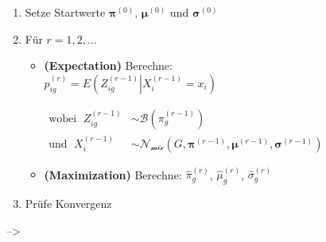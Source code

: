 \documentclass[
]{book}
\begin{document}
\begin{enumerate}
\def\labelenumi{\arabic{enumi}.}
\item
  Setze Startwerte \(\boldsymbol{\pi}^{(0)}\), \(\boldsymbol{\mu}^{(0)}\) und \(\boldsymbol{\sigma}^{(0)}\)
\item
  Für \(r=1,2,\dots\)

  \begin{itemize}
  \item
    {\textbf{(Expectation)} } Berechne:\\

    \(p_{ig}^{(r)}=E\left(Z_{ig}^{(r-1)}\left|X_i^{(r-1)}=x_i\right.\right)\)

    \(\begin{align*}  \text{wobei }\;Z_{ig}^{(r-1)}&\sim\mathcal{B}\left(\pi_g^{(r-1)}\right)\\  \text{und }\;X_i^{(r-1)}&\sim \mathcal{N}_{\mathcal{mix}}(G,\boldsymbol{\pi}^{(r-1)},\boldsymbol{\mu}^{(r-1)},\boldsymbol{\sigma}^{(r-1)})  \end{align*}\)
  \item
    {\textbf{(Maximization)}} Berechne: \(\hat\pi_g^{(r)}\), \(\hat\mu_g^{(r)}\), \(\hat\sigma_g^{(r)}\)
  \end{itemize}
\item
  Prüfe Konvergenz
\end{enumerate}

--\textgreater{}

  
\end{document}
